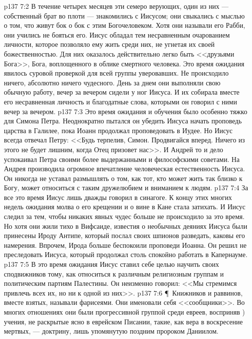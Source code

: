 \vs p137 7:2 В течение четырех месяцев эти семеро верующих, один из них --- собственный брат во плоти --- знакомились с Иисусом; они свыкались с мыслью о том, что живут бок о бок с этим Богочеловеком. Хотя они называли его Рабби, они учились не бояться его. Иисус обладал тем несравненным очарованием личности, которое позволяло ему жить среди них, не угнетая их своей божественностью. Для них оказалось действительно легко быть <<друзьями Бога>>, Бога, воплощенного в облике смертного человека. Это время ожидания явилось суровой проверкой для всей группы уверовавших. Не происходило ничего, абсолютно ничего чудесного. День за днем они выполняли свою обычную работу, вечер за вечером сидели у ног Иисуса. И их собирала вместе его несравненная личность и благодатные слова, которыми он говорил с ними вечер за вечером.
\vs p137 7:3 Это время ожидания и обучения было особенно тяжко для Симона Петра. Неоднократно пытался он убедить Иисуса начать проповедь царства в Галилее, пока Иоанн продолжал проповедовать в Иудее. Но Иисус всегда отвечал Петру: <<Будь терпелив, Симон. Продвигайся вперед. Ничего из этого не будет лишним, когда Отец призовет нас>>. И Андрей то и дело успокаивал Петра своими более выдержанными и философскими советами. На Андрея производила огромное впечатление человеческая естественность Иисуса. Он никогда не уставал размышлять о том, как тот, кто может жить так близко к Богу, может относиться с таким дружелюбием и вниманием к людям.
\vs p137 7:4 За все это время Иисус лишь дважды говорил в синагоге. К концу этих многих недель ожидания молва о его крещении и о вине в Кане стала затихать. И Иисус следил за тем, чтобы никаких явных чудес больше не происходило за это время. Но хотя они жили тихо в Вифсаиде, известия о необычных деяниях Иисуса были принесены Ироду Антипе, который послал своих шпионов разведать, каковы его намерения. Впрочем, Ирода больше беспокоили проповеди Иоанна. Он решил не преследовать Иисуса, который продолжал столь спокойно работать в Капернауме.
\vs p137 7:5 В это время ожидания Иисус ставил себе целью научить своих сподвижников тому, как относиться к различным религиозным группам и политическим партиям Палестины. Он неизменно говорил: <<Мы стремимся привлечь всех их, но  ни к одной из них>>.
\vs p137 7:6 \P\ Книжников и раввинов, вместе взятых, называли фарисеями. Они именовали себя <<сообщники>>. Во многих отношениях они были прогрессивной группой среди евреев, восприняв ) учения, не раскрытые ясно в еврейском Писании, такие, как вера в воскресение мертвых, --- доктрину, лишь упомянутую поздним пророком Даниилом.
